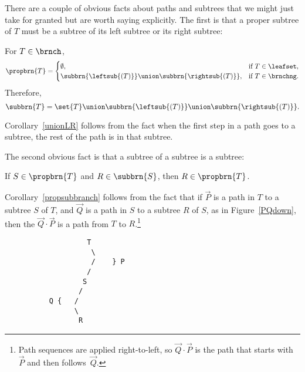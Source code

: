 \begin{definition}
There are a couple of obvious facts about paths and subtrees that we
might just take for granted but are worth saying explicitly.
The first is that a proper subtree of $T$ must be a subtree of its
left subtree or its right subtree:

\begin{corollary}\label{unionLR}
For $T \in \brnch$,
\[
\propbrn{T} =
\begin{cases}
  \emptyset, & \text{if $T \in \leafset$},\\
  \subbrn{\leftsub{(T)}} \union \subbrn{\rightsub{(T)}},
            & \text{if}\ T \in \brnchng.
\end{cases}
\]
Therefore,
\begin{equation}\label{unionTLR}
\subbrn{T} = \set{T} \union \subbrn{\leftsub{(T)}} \union \subbrn{\rightsub{(T)}}.
\end{equation}
\end{corollary}

Corollary~\ref{unionLR} follows from the fact when the first step in a
path goes to a subtree, the rest of the path is in that subtree.

The second obvious fact is that a subtree of a subtree is a subtree:

\begin{corollary}\label{propsubbranch}
If  $S \in \propbrn{T}$ and $R \in \subbrn{S}$, then $R \in \propbrn{T}$.
\end{corollary}

Corollary~\ref{propsubbranch} follows from the fact that if $\vec{P}$
is a path in $T$ to a subtree $S$ of $T$, and $\vec{Q}$ is a path in
$S$ to a subtree $R$ of $S$, as in Figure~\ref{PQdown}, then the
 $\vec{Q} \cdot \vec{P}$ is a path from $T$ to
$R$.\footnote{Path sequences are applied right-to-left, so $\vec{Q}
  \cdot \vec{P}$ is the path that starts with~$\vec{P}$ and then
  follows~$\vec{Q}$.}


\begin{figure}


\begin{center}
\begin{verbatim}
              T
               \
               /    } P
              /
             S
            /
     Q {   /
           \
            R
\end{verbatim}   
\end{center}


\end{figure}
\end{definition}
